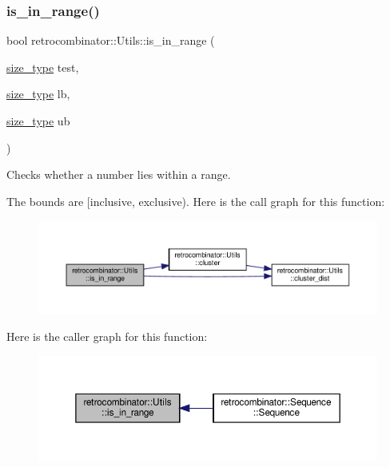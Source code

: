 \subsubsection{\texorpdfstring{is\+\_\+in\+\_\+range()}{is\_in\_range()}}
{\footnotesize\ttfamily bool retrocombinator\+::\+Utils\+::is\+\_\+in\+\_\+range (\begin{DoxyParamCaption}\item[{\hyperlink{constants_8h_a8e1541b50cee66a791df4c437ccbb385}{size\+\_\+type}}]{test,  }\item[{\hyperlink{constants_8h_a8e1541b50cee66a791df4c437ccbb385}{size\+\_\+type}}]{lb,  }\item[{\hyperlink{constants_8h_a8e1541b50cee66a791df4c437ccbb385}{size\+\_\+type}}]{ub }\end{DoxyParamCaption})\hspace{0.3cm}{\ttfamily [inline]}}



Checks whether a number lies within a range. 

The bounds are \mbox{[}inclusive, exclusive). Here is the call graph for this function\+:
\nopagebreak
\begin{figure}[H]
\begin{center}
\leavevmode
\includegraphics[width=350pt]{namespaceretrocombinator_1_1Utils_a984680ddd6d1f7ccee9e0f040ff16183_cgraph}
\end{center}
\end{figure}
Here is the caller graph for this function\+:
\nopagebreak
\begin{figure}[H]
\begin{center}
\leavevmode
\includegraphics[width=350pt]{namespaceretrocombinator_1_1Utils_a984680ddd6d1f7ccee9e0f040ff16183_icgraph}
\end{center}
\end{figure}
